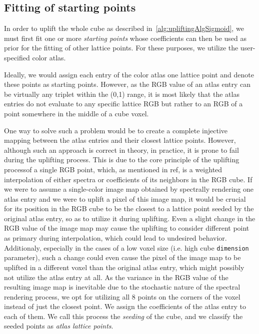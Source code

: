 \subsection{Fitting of starting points}

In order to uplift the whole cube as described in~\cref{alg:upliftingAlgSigmoid}, we must first fit one or more \emph{starting points} whose coefficients can then be used as prior for the fitting of other lattice points. For these purposes, we utilize the user-specified color atlas.

Ideally, we would assign each entry of the color atlas one lattice point and denote these points as starting points. However, as the RGB value of an atlas entry can be virtually any triplet within the (0,1) range, it is most likely that the atlas entries do not evaluate to any specific lattice RGB but rather to an RGB of a point somewhere in the middle of a cube voxel.

One way to solve such a problem would be to create a complete injective mapping between the atlas entries and their closest lattice points. However, although such an approach is correct in theory, in practice, it is prone to fail during the uplifting process. This is due to the core principle of the uplifting processof a single RGB point, which, as mentioned in ref, is a weighted interpolation of either spectra or coefficients of its neighbors in the RGB cube. If we were to assume a single-color image map obtained by spectrally rendering one atlas entry and we were to uplift a pixel of this image map, it would be crucial for its position in the RGB cube to be the closest to a lattice point seeded by the original atlas entry, so as to utilize it during uplifting. Even a slight change in the RGB value of the image map may cause the uplifting to consider different point as primary during interpolation, which could lead to undesired behavior. Additionaly, especially in the cases of a low voxel size (i.e. high cube \texttt{dimension} parameter), such a change could even cause the pixel of the image map to be uplifted in a different voxel than the original atlas entry, which might possibly not utilize the atlas entry at all. As the variance in the RGB value of the resulting image map is inevitable due to the stochastic nature of the spectral rendering process, we opt for utilizing all 8 points on the corners of the voxel instead of just the closest point. We assign the coefficients of the atlas entry to each of them. We call this process the \emph{seeding} of the cube, and we classify the seeded points as \emph{atlas lattice points}.

